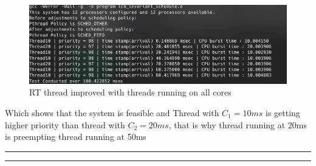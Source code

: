 \documentclass[a4paper,11pt]{article}%
\newenvironment{qanda}{\setlength{\parindent}{0pt}}{\bigskip}
\begin{document}
\begin{qanda}
\begin{enumerate}
\begin{enumerate}
\begin{enumerate}
					\begin{figure}[H]
						\centering
						\includegraphics[scale=0.5]{figures/4_e.png}
						\caption{RT thread improved with threads running on all cores}
						\label{rm}
					\end{figure}

					Which shows that the system is feasible and Thread with $C_1 = 10ms$ is getting higher priority than thread with $C_2 = 20ms$, that is why thread running at 20ms is preempting thread running at 50ms

				\end{enumerate} 
				
				
				



			\end{enumerate}


	\end{enumerate}





\end{qanda}




\vfill
\hrule
\vspace{0.5cm}



\vspace{1cm}
\hrule
\vspace{0.5cm}


\end{document}
